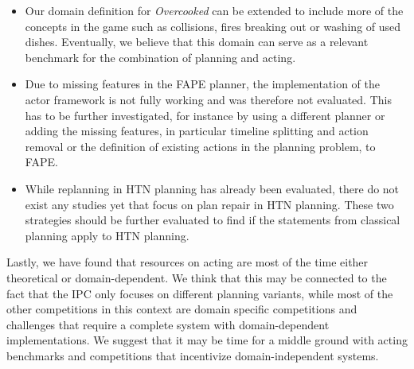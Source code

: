 \begin{itemize}
\item Our domain definition for \textit{Overcooked} can be extended to include more of the concepts in the game such as collisions, fires breaking out or washing of used dishes.
Eventually, we believe that this domain can serve as a relevant benchmark for the combination of planning and acting.

\item Due to missing features in the \ac{FAPE} planner, the implementation of the actor framework is not fully working and was therefore not evaluated.
This has to be further investigated, for instance by using a different planner or adding the missing features, in particular timeline splitting and action removal or the definition of existing actions in the planning problem, to \ac{FAPE}.

\item While replanning in \ac{HTN} planning has already been evaluated, there do not exist any studies yet that focus on plan repair in \ac{HTN} planning.
These two strategies should be further evaluated to find if the statements from classical planning apply to \ac{HTN} planning.
\end{itemize}

Lastly, we have found that resources on acting are most of the time either theoretical or domain-dependent.
We think that this may be connected to the fact that the \ac{IPC} only focuses on different planning variants, while most of the other competitions in this context are domain specific competitions and challenges that require a complete system with domain-dependent implementations.
We suggest that it may be time for a middle ground with acting benchmarks and competitions that incentivize domain-independent systems.
